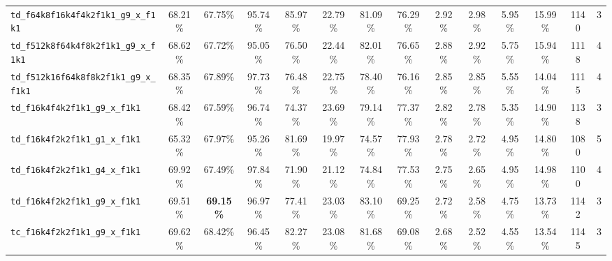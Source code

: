 \documentclass{article}
\begin{document}
\begin{table}[t]
{\begin{minipage}{\linewidth}
{\begin{tabular}{@{}l|ccccccc|cccc|cc@{}}
	\texttt{td\_f64k8f16k4f4k2f1k1\_g9\_x\_f1k1}   &          68.21\% &          67.75\% &          95.74\% &          85.97\% &          22.79\% &          81.09\% &          76.29\% &           2.92\% &           2.98\% &           5.95\% &          15.99\% &          1140 &           3  \\
	\texttt{td\_f512k8f64k4f8k2f1k1\_g9\_x\_f1k1}  &          68.62\% &          67.72\% &          95.05\% &          76.50\% &          22.44\% &          82.01\% &          76.65\% &           2.88\% &           2.92\% &           5.75\% &          15.94\% &          1118 &           4  \\
	\texttt{td\_f512k16f64k8f8k2f1k1\_g9\_x\_f1k1} &          68.35\% &          67.89\% &          97.73\% &          76.48\% &          22.75\% &          78.40\% &          76.16\% &           2.85\% &           2.85\% &           5.55\% &          14.04\% &          1115 &           4  \\
	\texttt{td\_f16k4f4k2f1k1\_g9\_x\_f1k1}        &          68.42\% &          67.59\% &          96.74\% &          74.37\% &          23.69\% &          79.14\% &          77.37\% &           2.82\% &           2.78\% &           5.35\% &          14.90\% &          1138 &           3  \\
	\texttt{td\_f16k4f2k2f1k1\_g1\_x\_f1k1}        &          65.32\% &          67.97\% &          95.26\% &          81.69\% &          19.97\% &          74.57\% &          77.93\% &           2.78\% &           2.72\% &           4.95\% &          14.80\% &          1080 &           5  \\
	\texttt{td\_f16k4f2k2f1k1\_g4\_x\_f1k1}        &          69.92\% &          67.49\% &          97.84\% &          71.90\% &          21.12\% &          74.84\% &          77.53\% &           2.75\% &           2.65\% &           4.95\% &          14.98\% &          1100 &           4  \\
	\texttt{td\_f16k4f2k2f1k1\_g9\_x\_f1k1}        &          69.51\% & \textbf{69.15\%} &          96.97\% &          77.41\% &          23.03\% &          83.10\% &          69.25\% &           2.72\% &           2.58\% &           4.75\% &          13.73\% &          1142 &           3  \\
	\texttt{tc\_f16k4f2k2f1k1\_g9\_x\_f1k1}        &          69.62\% &          68.42\% &          96.45\% &          82.27\% &          23.08\% &          81.68\% &          69.08\% &           2.68\% &           2.52\% &           4.55\% &          13.54\% &          1145 &           3  \\

\end{tabular}}
\end{minipage}}
\end{table}
\end{document}
